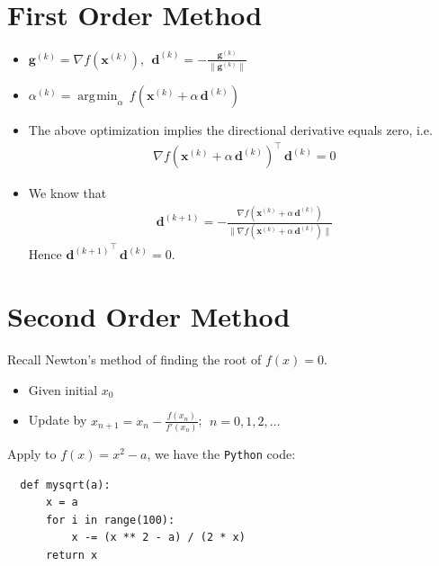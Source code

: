 \documentclass[10pt]{extarticle}
\newcommand{\ds}{\displaystyle}
\DeclareMathOperator*{\argmin}{\arg\!\min}
\theoremstyle{definition}
\newcommand{\vd}{\mathbf{d}}
\newcommand{\vx}{\mathbf{x}}
\newcommand{\vg}{\mathbf{g}}
\begin{document}
\newpage

\section*{First Order Method}
\begin{itemize}
  \item $\ds\vg^{(k)} = \nabla f(\vx^{(k)})$, $\;\ds\vd^{(k)} = -\frac{\vg^{(k)}}{\|\vg^{(k)}\|}$
  \item $\ds\alpha^{(k)} = \argmin_\alpha\,f(\vx^{(k)} + \alpha\,\vd^{(k)})$
  \item The above optimization implies the directional derivative equals zero, i.e. 
    \begin{align*}
      \nabla f(\vx^{(k)} + \alpha\,\vd^{(k)})^\top\,\vd^{(k)} = 0
    \end{align*}
  \item We know that 
    \begin{align*}
      \vd^{(k + 1)} = -\frac{\nabla f(\vx^{(k)} + \alpha\,\vd^{(k)})}{\|\nabla f(\vx^{(k)} + \alpha\,\vd^{(k)})\|}
    \end{align*}
    Hence $\ds{\vd^{(k + 1)}}^\top\,\vd^{(k)} = 0$.
\end{itemize}

\newpage

\section*{Second Order Method}

Recall Newton's method of finding the root of $f(x) = 0$.
\begin{itemize}
  \item Given initial $x_0$
  \item Update by $\ds x_{n + 1} = x_n - \frac{f(x_n)}{f'(x_n)}$; $\;n = 0, 1, 2, \ldots$
\end{itemize}
Apply to $f(x) = x^2 - a$, we have the {\tt Python} code:
\begin{verbatim}
  def mysqrt(a):
      x = a
      for i in range(100):
          x -= (x ** 2 - a) / (2 * x) 
      return x
\end{verbatim}
\newpage
\end{document}
